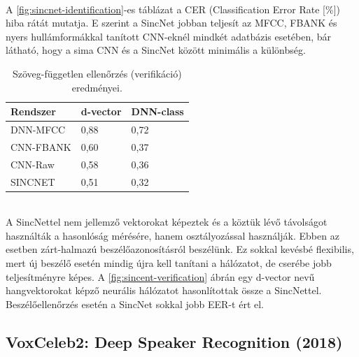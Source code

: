 \ \\
A \ref{fig:sincnet-identification}-es táblázat a CER (Classification Error Rate [\%]) hiba rátát mutatja. E szerint a SincNet jobban teljesít az MFCC, FBANK és nyers hullámformákkal tanított CNN-eknél mindkét adatbázis esetében, bár látható, hogy a sima CNN és a SincNet között minimális a különbség.
\newline
\begin{table}[!ht]
	\begin{tabular}{*3l} \toprule
		\bfseries Rendszer & \bfseries d-vector & \bfseries DNN-class \\ \midrule
		DNN-MFCC & 0,88 & 0,72 \\
		\rowcolor{gray!10} 
		CNN-FBANK & 0,60 & 0,37 \\
		CNN-Raw  & 0,58 & 0,36 \\
		\rowcolor{gray!10} 
		SINCNET & 0,51 & 0,32 \\
		\bottomrule
		\hline
	\end{tabular}
	\centering
	\caption{Szöveg-független ellenőrzés (verifikáció) eredményei.}
	\label{fig:sincnet-verification}
\end{table}
\ \\
\newline
A SincNettel nem jellemző vektorokat képeztek és a köztük lévő távolságot használták a hasonlóság mérésére, hanem osztályozással használják. Ebben az esetben zárt-halmazú beszélőazonosításról beszélünk. Ez sokkal kevésbé flexibilis, mert új beszélő esetén mindig újra kell tanítani a hálózatot, de cserébe jobb teljesítményre képes. A \ref{fig:sincent-verification} ábrán egy d-vector nevű hangvektorokat képző neurális hálózatot hasonlítottak össze a SincNettel. Beszélőellenőrzés esetén a SincNet sokkal jobb EER-t ért el.
\newpage
\subsection{VoxCeleb2: Deep Speaker Recognition (2018)~\cite{voxceleb2}}


